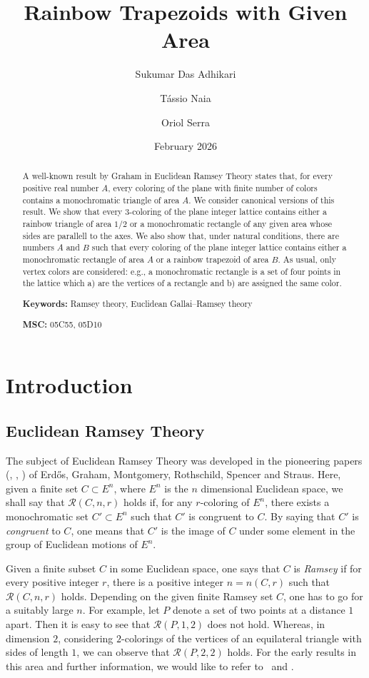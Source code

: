 \documentclass[a4paper, 11pt,reqno]{amsart}
\title{Rainbow Trapezoids with Given Area}
\author{Sukumar Das Adhikari}
\author{T\'assio Naia}
\author{Oriol Serra}
\date{February 2026}
\theoremstyle{definition}
\begin{document}
\begin{abstract}
  A well-known result by Graham in Euclidean Ramsey Theory states
  that, for every positive real number $A$, every coloring of the
  plane with finite number of colors contains a monochromatic triangle
  of area $A$. We consider canonical versions of this result. We show
  that every $3$-coloring of the plane integer lattice contains either
  a rainbow triangle of area $1/2$ or a monochromatic rectangle of any
  given area whose sides are parallell to the axes. We also show that,
  under natural conditions, there are numbers $A$ and $B$ such that
  every coloring of the plane integer lattice contains either a
  monochromatic rectangle of area $A$ or a rainbow trapezoid of area
  $B$. As usual, only vertex colors are considered: e.g., a
  monochromatic rectangle is a set of four points in the lattice which
  a) are the vertices of a rectangle and b) are assigned the same
  color.

\smallskip
\noindent
{\bf Keywords:} Ramsey theory, Euclidean Gallai--Ramsey theory

\noindent
{\bf MSC:} 05C55, 05D10
\end{abstract}

\maketitle

\section{Introduction}

\subsection{Euclidean Ramsey Theory}
The subject of Euclidean Ramsey Theory was developed in the pioneering papers
(\cite{EGMRSS}, \cite{EGMRSS1}, \cite{EGMRSS2}) of
Erd\H{o}s, Graham, Montgomery, Rothschild, Spencer and Straus.
Here, given a finite set $C\subset E^n$, where $E^n$ is the $n$ dimensional Euclidean space,
we shall say that ${\mathcal R}(C,n,r)$
holds if, for any $r$-coloring of $E^n$, there exists a monochromatic set
$C'\subset E^n$ such that $C'$ is congruent to $C$.
By saying that $C'$ is \emph{congruent} to $C$, one means that $C'$ is the
image of $C$ under some element in the group of Euclidean motions of $E^n$.

Given a finite subset $C$ in some Euclidean space, one says
that $C$ is \emph{ Ramsey} if for every positive integer
$r$, there is a positive integer $n=n(C,r)$ such that ${\mathcal R}(C,n,r)$
holds. Depending on the given finite Ramsey set $C$, one has to go for a suitably large $n$.
For example, let $P$ denote a set of two points at a distance $1$ apart.
Then  it is easy to see that ${\mathcal R}(P,1,2)$ does not hold.
Whereas, in dimension $2$, considering $2$-colorings of the vertices of
an equilateral triangle with sides of length $1$, we can
observe that ${\mathcal R}(P,2,2)$ holds.
For the early results in this area and further information, we would like to refer to~\cite{gra1} and
\cite{Gr2}.
\end{document}
